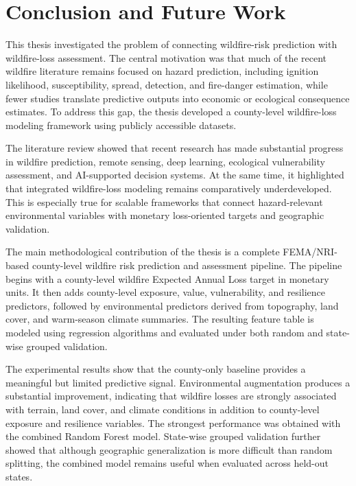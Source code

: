 \chapter{Conclusion and Future Work}
\label{chap:conclusion}

This thesis investigated the problem of connecting wildfire-risk prediction with wildfire-loss assessment. The central motivation was that much of the recent wildfire literature remains focused on hazard prediction, including ignition likelihood, susceptibility, spread, detection, and fire-danger estimation, while fewer studies translate predictive outputs into economic or ecological consequence estimates. To address this gap, the thesis developed a county-level wildfire-loss modeling framework using publicly accessible datasets.

The literature review showed that recent research has made substantial progress in wildfire prediction, remote sensing, deep learning, ecological vulnerability assessment, and AI-supported decision systems. At the same time, it highlighted that integrated wildfire-loss modeling remains comparatively underdeveloped. This is especially true for scalable frameworks that connect hazard-relevant environmental variables with monetary loss-oriented targets and geographic validation.

The main methodological contribution of the thesis is a complete FEMA/NRI-based county-level wildfire risk prediction and assessment pipeline. The pipeline begins with a county-level wildfire Expected Annual Loss target in monetary units. It then adds county-level exposure, value, vulnerability, and resilience predictors, followed by environmental predictors derived from topography, land cover, and warm-season climate summaries. The resulting feature table is modeled using regression algorithms and evaluated under both random and state-wise grouped validation.

The experimental results show that the county-only baseline provides a meaningful but limited predictive signal. Environmental augmentation produces a substantial improvement, indicating that wildfire losses are strongly associated with terrain, land cover, and climate conditions in addition to county-level exposure and resilience variables. The strongest performance was obtained with the combined Random Forest model. State-wise grouped validation further showed that although geographic generalization is more difficult than random splitting, the combined model remains useful when evaluated across held-out states.

